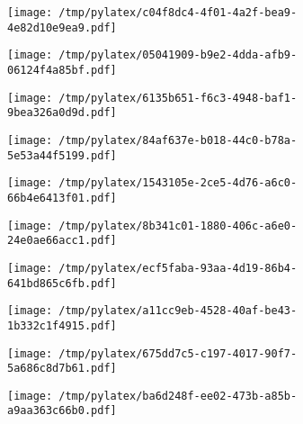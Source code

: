 \documentclass{article}
\begin{document}
\begin{figure}[htbp]
\begin{subfigure}[b]{.3\linewidth}
\texttt{[image: /tmp/pylatex/c04f8dc4-4f01-4a2f-bea9-4e82d10e9ea9.pdf]}
\end{subfigure}
\begin{subfigure}[b]{.3\linewidth}
\texttt{[image: /tmp/pylatex/05041909-b9e2-4dda-afb9-06124f4a85bf.pdf]}
\end{subfigure}
\begin{subfigure}[b]{.3\linewidth}
\texttt{[image: /tmp/pylatex/6135b651-f6c3-4948-baf1-9bea326a0d9d.pdf]}
\end{subfigure}
\begin{subfigure}[b]{.3\linewidth}
\texttt{[image: /tmp/pylatex/84af637e-b018-44c0-b78a-5e53a44f5199.pdf]}
\end{subfigure}
\begin{subfigure}[b]{.3\linewidth}
\texttt{[image: /tmp/pylatex/1543105e-2ce5-4d76-a6c0-66b4e6413f01.pdf]}
\end{subfigure}
\begin{subfigure}[b]{.3\linewidth}
\texttt{[image: /tmp/pylatex/8b341c01-1880-406c-a6e0-24e0ae66acc1.pdf]}
\end{subfigure}
\begin{subfigure}[b]{.3\linewidth}
\texttt{[image: /tmp/pylatex/ecf5faba-93aa-4d19-86b4-641bd865c6fb.pdf]}
\end{subfigure}
\begin{subfigure}[b]{.3\linewidth}
\texttt{[image: /tmp/pylatex/a11cc9eb-4528-40af-be43-1b332c1f4915.pdf]}
\end{subfigure}
\begin{subfigure}[b]{.3\linewidth}
\texttt{[image: /tmp/pylatex/675dd7c5-c197-4017-90f7-5a686c8d7b61.pdf]}
\end{subfigure}
\begin{subfigure}[b]{.3\linewidth}
\texttt{[image: /tmp/pylatex/ba6d248f-ee02-473b-a85b-a9aa363c66b0.pdf]}
\end{subfigure}
\end{figure}
\end{document}
